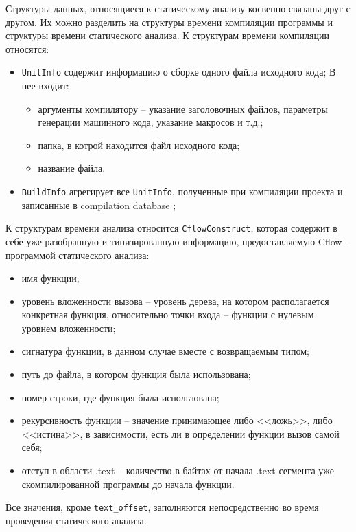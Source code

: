 Структуры данных, относящиеся к статическому анализу косвенно связаны друг с
другом. 
Их можно разделить на структуры времени компиляции программы и структуры времени статического анализа.
К структурам времени компиляции относятся:
\begin{itemize}
    \item \texttt{UnitInfo} содержит информацию о сборке одного файла исходного кода;
        В нее входит:
        \begin{itemize}
            \item аргументы компилятору -- указание заголовочных файлов, параметры генерации машинного кода,
                указание макросов и т.д.;
            \item папка, в котрой находится файл исходного кода;
            \item название файла.
        \end{itemize}
    \item \texttt{BuildInfo} агрегирует все \texttt{UnitInfo}, полученные при компиляции проекта и записанные в
        compilation database \autocite{compile-db};
\end{itemize}
К структурам времени анализа относится \texttt{CflowConstruct}, которая содержит в себе уже разобранную
и типизированную информацию, предоставляемую Cflow -- программой статического анализа:
\begin{itemize}
    \item имя функции;
    \item уровень вложенности вызова -- уровень дерева, на котором располагается конкретная функция, относительно
        точки входа -- функции с нулевым уровнем вложенности;
    \item сигнатура функции, в данном случае вместе с возвращаемым типом;
    \item путь до файла, в котором функция была использована;
    \item номер строки, где функция была использована;
    \item рекурсивность функции -- значение принимающее либо <<ложь>>, либо <<истина>>, в зависимости, есть ли в
        определении функции вызов самой себя;
    \item отступ в области .text -- количество в байтах от начала .text-сегмента уже скомпилированной программы до
        начала функции.
\end{itemize}

Все значения, кроме \texttt{text\_offset}, заполняются непосредственно во время проведения статического анализа.

